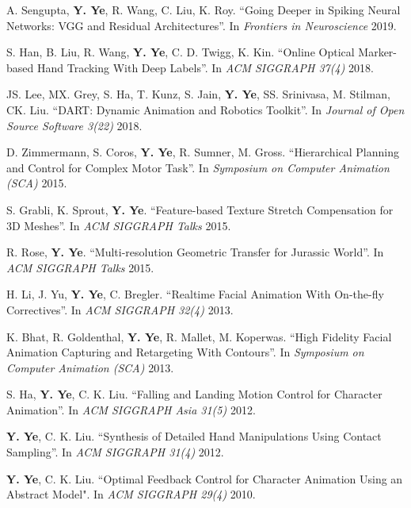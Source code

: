 \documentclass[margin,line]{res}
\begin{document}
\begin{resume}
\vspace*{-.1in}
A. Sengupta, {\bf Y. Ye}, R. Wang, C. Liu, K. Roy. ``Going Deeper in Spiking Neural Networks: VGG and Residual Architectures''. In {\em Frontiers in Neuroscience} 2019.

\vspace*{-.1in}
S. Han, B. Liu, R. Wang, {\bf Y. Ye}, C. D. Twigg, K. Kin. ``Online Optical Marker-based Hand Tracking With Deep Labels''. In {\em ACM SIGGRAPH 37(4)} 2018.

\vspace*{-.1in}
JS. Lee, MX. Grey, S. Ha, T. Kunz, S. Jain, {\bf Y. Ye}, SS. Srinivasa, M. Stilman, CK. Liu. ``DART: Dynamic Animation and Robotics Toolkit''. In {\em Journal of Open Source Software 3(22)} 2018.

\vspace*{-.1in}
D. Zimmermann, S. Coros, {\bf Y. Ye}, R. Sumner, M. Gross. ``Hierarchical Planning and Control for Complex Motor Task''. In {\em Symposium on Computer Animation (SCA)} 2015.

\vspace*{-.1in}
S. Grabli, K. Sprout, {\bf Y. Ye}. ``Feature-based Texture Stretch Compensation for 3D Meshes''. In {\em ACM SIGGRAPH Talks} 2015.

\vspace*{-.1in}
R. Rose, {\bf Y. Ye}. ``Multi-resolution Geometric Transfer for Jurassic World''. In {\em ACM SIGGRAPH Talks} 2015.

\vspace*{-.1in}
H. Li, J. Yu, {\bf Y. Ye}, C. Bregler. ``Realtime Facial Animation With On-the-fly Correctives''. In {\em ACM SIGGRAPH 32(4)} 2013.

\vspace*{-.1in}
K. Bhat, R. Goldenthal, {\bf Y. Ye}, R. Mallet, M. Koperwas. ``High Fidelity Facial Animation Capturing and Retargeting With Contours''. In {\em Symposium on Computer Animation (SCA)} 2013. 

\vspace*{-.1in}
S. Ha, {\bf Y. Ye}, C. K. Liu. ``Falling and Landing Motion Control for Character Animation''. In {\em ACM SIGGRAPH Asia 31(5)} 2012.

\vspace*{-.1in}
{\bf Y. Ye}, C. K. Liu. ``Synthesis of Detailed Hand Manipulations Using Contact Sampling''. In {\em ACM SIGGRAPH 31(4)} 2012.

\vspace*{-.1in}
{\bf Y. Ye}, C. K. Liu. ``Optimal Feedback Control for Character Animation Using an Abstract Model". In {\em ACM SIGGRAPH 29(4)} 2010.


\end{resume}
\end{document}
